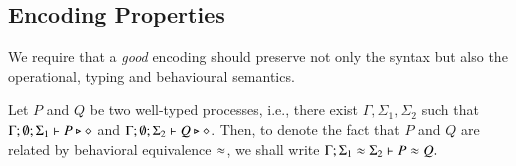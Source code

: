 \subsection{Encoding Properties}

We require that a {\em good} encoding should 
preserve not only the syntax but
also the operational, typing and behavioural
semantics. 

\begin{notation}
	Let $P$ and $Q$ be two well-typed processes, i.e., 
	there exist $\Gamma, \Sigma_1, \Sigma_2$ such that 
	$\Gamma; \emptyset; \Sigma_1 \vdash P \triangleright \diamond$ 
	and
	$\Gamma; \emptyset; \Sigma_2 \vdash Q \triangleright \diamond$.
	Then, to denote the fact that 
	$P$ and $Q$ are related by behavioral equivalence $\approx$, we shall write
	$
		\Gamma; \Sigma_1 \approx \Sigma_2 \vdash P \approx Q.
	$
\end{notation}

